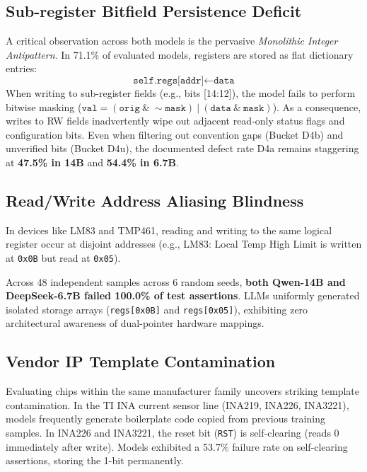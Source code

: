 \documentclass[conference]{IEEEtran}
\begin{document}
\subsection{Sub-register Bitfield Persistence Deficit}
A critical observation across both models is the pervasive \textit{Monolithic Integer Antipattern}. In 71.1\% of evaluated models, registers are stored as flat dictionary entries:
\begin{equation}
    \texttt{self.regs[addr]} \leftarrow \texttt{data}
\end{equation}
When writing to sub-register fields (e.g., bits [14:12]), the model fails to perform bitwise masking ($\texttt{val} = (\texttt{orig} \ \& \ \sim\texttt{mask}) \ | \ (\texttt{data} \ \& \ \texttt{mask})$). As a consequence, writes to RW fields inadvertently wipe out adjacent read-only status flags and configuration bits. Even when filtering out convention gaps (Bucket D4b) and unverified bits (Bucket D4u), the documented defect rate D4a remains staggering at \textbf{47.5\% in 14B} and \textbf{54.4\% in 6.7B}.

\subsection{Read/Write Address Aliasing Blindness}
In devices like LM83 and TMP461, reading and writing to the same logical register occur at disjoint addresses (e.g., LM83: Local Temp High Limit is written at \texttt{0x0B} but read at \texttt{0x05}). 

Across 48 independent samples across 6 random seeds, \textbf{both Qwen-14B and DeepSeek-6.7B failed 100.0\% of test assertions}. LLMs uniformly generated isolated storage arrays (\texttt{regs[0x0B]} and \texttt{regs[0x05]}), exhibiting zero architectural awareness of dual-pointer hardware mappings.

\subsection{Vendor IP Template Contamination}
Evaluating chips within the same manufacturer family uncovers striking template contamination. In the TI INA current sensor line (INA219, INA226, INA3221), models frequently generate boilerplate code copied from previous training samples. In INA226 and INA3221, the reset bit (\texttt{RST}) is self-clearing (reads 0 immediately after write). Models exhibited a 53.7\% failure rate on self-clearing assertions, storing the 1-bit permanently.
\end{document}
